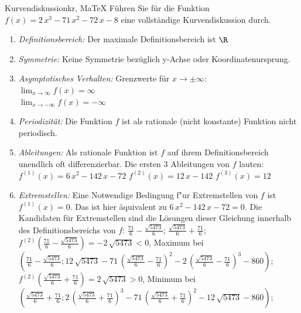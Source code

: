  \providecommand{\MoIl}{(} 
 \providecommand{\MoIr}{)}
 \providecommand{\MIntvlSep}{;} 
 \providecommand{\MElSetSep}{;} 
 \begin{MAufgabe}{Kurvendiskussion}{kr, MaTeX}
 F\"uhren Sie f\"ur die Funktion $f(x)=2\, x^3 - 71\, x^2 - 72\, x - 8$ eine vollst\"andige Kurvendiskussion durch.\\ 
 \ifLsg\Loesung
 \begin{enumerate}
 \item \emph{Definitionsbereich:} 
 Der maximale Definitionsbereich ist $\R$\item \emph{Symmetrie:} 
 Keine Symmetrie bez\"uglich y-Achse oder Koordinatenursprung.\item \emph{Asymptotisches Verhalten:} 
 Grenzwerte f\"ur $x\rightarrow \pm \infty$: \\ 
 $\lim_{x\rightarrow \infty} f(x)=\infty$ \\ 
 $\lim_{x\rightarrow -\infty} f(x)=- \infty$ \\ 
 \item \emph{Periodizit\"at:} 
 Die Funktion $f$ ist als rationale (nicht konstante) Funktion nicht periodisch.\item \emph{Ableitungen:} 
 Als rationale Funktion ist $f$ auf ihrem Definitionsbereich unendlich oft differenzierbar. 
 Die ersten 3 Ableitungen von $f$ lauten: \\ 
 $f^{(1)}(x)=6\, x^2 - 142\, x - 72$\newline 
  $f^{(2)}(x)=12\, x - 142$\newline 
  $f^{(3)}(x)=12$\newline 
  \item \emph{Extremstellen:} 
 Eine Notwendige Bedingung f"ur Extremstellen von $f$ ist $f^{(1)}(x)=0$. 
 Das ist hier \"aquivalent zu $6\, x^2 - 142\, x - 72=0$. 
 Die Kandidaten f\"ur Extremstellen sind die L\"osungen dieser Gleichung innerhalb des Definitionsbereichs von $f$: $\frac{71}{6} - \frac{\sqrt{5473}}{6}$; $\frac{\sqrt{5473}}{6} + \frac{71}{6}$; \\ 
 $f^{(2)}(\frac{71}{6} - \frac{\sqrt{5473}}{6})=- 2\, \sqrt{5473}$$<0$, Maximum bei $(\frac{71}{6} - \frac{\sqrt{5473}}{6};12\, \sqrt{5473} - 71\, {\left(\frac{\sqrt{5473}}{6} - \frac{71}{6}\right)}^2 - 2\, {\left(\frac{\sqrt{5473}}{6} - \frac{71}{6}\right)}^3 - 860)$; \\ 
 $f^{(2)}(\frac{\sqrt{5473}}{6} + \frac{71}{6})=2\, \sqrt{5473}$$>0$, Minimum bei $(\frac{\sqrt{5473}}{6} + \frac{71}{6};2\, {\left(\frac{\sqrt{5473}}{6} + \frac{71}{6}\right)}^3 - 71\, {\left(\frac{\sqrt{5473}}{6} + \frac{71}{6}\right)}^2 - 12\, \sqrt{5473} - 860)$; \\ 

\end{enumerate}
\end{MAufgabe}

